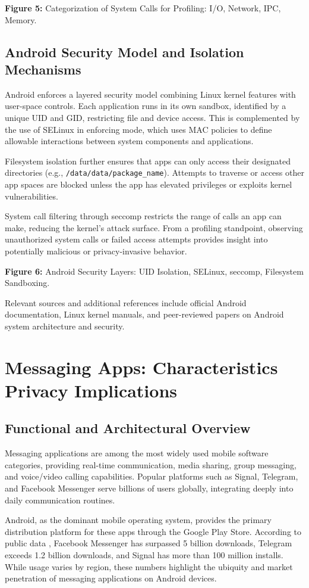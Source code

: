 \documentclass[a4paper,12pt]{report}
\begin{document}
\textbf{Figure 5:} Categorization of System Calls for Profiling: I/O, Network, IPC, Memory.

\subsection{ Android Security Model and Isolation Mechanisms}
Android enforces a layered security model combining Linux kernel features with user-space controls. Each application runs in its own sandbox, identified by a unique UID and GID, restricting file and device access. This is complemented by the use of SELinux in enforcing mode, which uses MAC policies to define allowable interactions between system components and applications.

Filesystem isolation further ensures that apps can only access their designated directories (e.g., \texttt{/data/data/{package\_name}}). Attempts to traverse or access other app spaces are blocked unless the app has elevated privileges or exploits kernel vulnerabilities.

System call filtering through seccomp restricts the range of calls an app can make, reducing the kernel's attack surface. From a profiling standpoint, observing unauthorized system calls or failed access attempts provides insight into potentially malicious or privacy-invasive behavior.

\textbf{Figure 6:} Android Security Layers: UID Isolation, SELinux, seccomp, Filesystem Sandboxing.

Relevant sources and additional references include official Android documentation, Linux kernel manuals, and peer-reviewed papers on Android system architecture and security.
\section{Messaging Apps: Characteristics  Privacy Implications}

\subsection{Functional and Architectural Overview}
Messaging applications are among the most widely used mobile software categories, providing real-time communication, media sharing, group messaging, and voice/video calling capabilities. Popular platforms such as Signal, Telegram, and Facebook Messenger serve billions of users globally, integrating deeply into daily communication routines.

Android, as the dominant mobile operating system, provides the primary distribution platform for these apps through the Google Play Store. According to public data \cite{statista2024messaging, googleplaydata2024}, Facebook Messenger has surpassed 5 billion downloads, Telegram exceeds 1.2 billion downloads, and Signal has more than 100 million installs. While usage varies by region, these numbers highlight the ubiquity and market penetration of messaging applications on Android devices.
\end{document}
